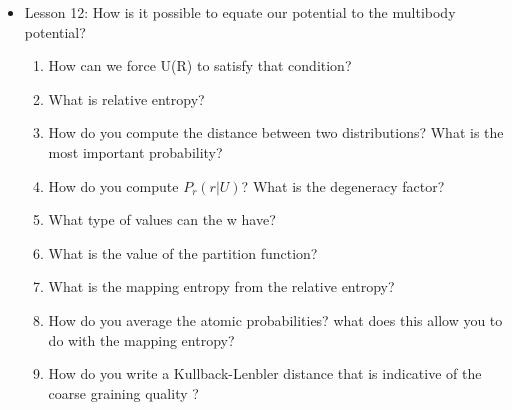 {\begin{itemize}
\begin{enumerate}
        \item How is the CG process?
        \item Is mapping invertible?
        \item What is the consistency condition?
        \item Obtain the potential energy that you get coarse-graining the system
        \item what is the multibody potential of mean force?
        \item When is your CG system ok? talking about the measured potential energy
        \item What is transferability? In the context of coarse-graining in molecular simulations or modeling, "transferability" refers to the ability of a coarse-grained model or representation to accurately capture and reproduce relevant properties of the system being studied. Transferability implies that the parameters and interactions used in the coarse-grained model, which are often derived from a more detailed or atomistic representation, are applicable and meaningful across different conditions or environments. This happens when the coarse grained potential is similar to the multibody potential of mean force?
        \item How do you allow the consistency condition for the momenta?
    \end{enumerate}
    \item Lesson 12: How is it possible to equate our potential to the multibody potential?
    \begin{enumerate}
        \item How can we force U(R) to satisfy that condition?
        \item What is relative entropy?
        \item How do you compute the distance between two distributions? What is the most important probability?
        \item How do you compute $P_r(r|U)$? What is the degeneracy factor?
        \item What type of values can the w have?
        \item What is the value of the partition function?
        \item What is the mapping entropy from the relative entropy?
        \item How do you average the atomic probabilities? what does this allow you to do with the mapping entropy?
        \item How do you write a Kullback-Lenbler distance that is indicative of the coarse graining quality ?

\end{enumerate}
\end{itemize}}
